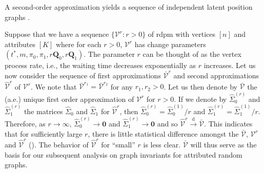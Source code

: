 \documentclass[10pt,journal,compsoc]{IEEEtran}
\theoremstyle{definition}
\begin{document}
A second-order approximation yields a sequence of independent latent
position graphs \cite{marchette08:_predic,scheinerman10:_model,hoff02:_laten}. 

Suppose that we have a sequence $\{\mathscr{V}^{r} \colon r > 0 \}$ of
rdpm with vertices $[n]$ and attributes $[K]$ where for each $r > 0$,
$\mathscr{V}^{r}$ has change parameters $(t^{*}, m, \pi_0, \pi_1, r
\mathbf{Q}_0, r \mathbf{Q}_1)$. The parameter $r$ can be thought of as
the vertex process rate, i.e., the waiting time decreases
exponentially as $r$ increases. Let us now consider the sequence of
first approximations $\bar{\mathscr{V}}^{r}$ and second approximations
$\widehat{\mathscr{V}}^{r}$ of $\mathscr{V}^{r}$. We note that
$\bar{\mathscr{V}}^{r_1} = \bar{\mathscr{V}}^{r_2}$ for any $r_1, r_2
> 0$. Let us then denote by $\bar{\mathscr{V}}$ the (a.e.) unique
first order approximation of $\mathscr{V}^{r}$ for $r > 0$. If we
denote by $\widehat{\Sigma}_{0}^{(r)}$ and
$\widehat{\Sigma}_{1}^{(r)}$ the matrices $\widehat{\Sigma}_0$ and
$\widehat{\Sigma}_1$ for $\widehat{\mathscr{V}}^{r}$, then
$\widehat{\Sigma}_0^{(r)} = \widehat{\Sigma}_0^{(1)}/r$ and
$\widehat{\Sigma}_{1}^{(r)} = \widehat{\Sigma}_1^{(1)}/r$. Therefore,
as $r \rightarrow \infty$, $\widehat{\Sigma}_0^{(r)} \rightarrow
\bm{0}$ and $\widehat{\Sigma}_1^{(r)} \rightarrow \bm{0}$ and so
$\widehat{\mathscr{V}}^{r} \overset{\mathrm{d}}{\longrightarrow}
\bar{\mathscr{V}}$. This indicates that for sufficiently large $r$,
there is little statistical difference amongst the
$\bar{\mathscr{V}}$, $\mathscr{V}^{r}$ and $\widehat{\mathscr{V}}^{r}$
(\cite[Theorem 2]{lee11}). The behavior of
$\widehat{\mathscr{V}}^{r}$ for ``small'' $r$ is less
clear. $\bar{\mathscr{V}}$ will thus serve as the basis for our
subsequent analysis on graph invariants for attributed random graphs.
\end{document}
